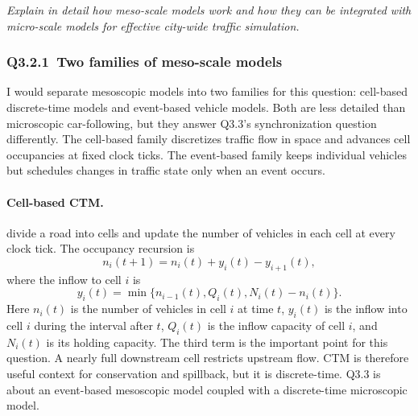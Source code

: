 \begin{bibunit}[plainnat]
\textit{Explain in detail how meso-scale models work and how they can be integrated with micro-scale models for effective city-wide traffic simulation.}

\subsubsection{Q3.2.1\ Two families of meso-scale models}

I would separate mesoscopic models into two families for this question:
cell-based discrete-time models and event-based vehicle models. Both are less
detailed than microscopic car-following, but they answer Q3.3's synchronization
question differently. The cell-based family discretizes traffic flow in space
and advances cell occupancies at fixed clock ticks. The event-based family
keeps individual vehicles but schedules changes in traffic state only when an
event occurs.

\paragraph*{Cell-based CTM.}
\citet{daganzo1994ctm} divide a road into cells and update the number of vehicles
in each cell at every clock tick. The occupancy recursion is
\[
  n_i(t+1)=n_i(t)+y_i(t)-y_{i+1}(t),
\]
where the inflow to cell $i$ is
\[
  y_i(t)=\min\{n_{i-1}(t),Q_i(t),N_i(t)-n_i(t)\}.
\]
Here $n_i(t)$ is the number of vehicles in cell $i$ at time $t$, $y_i(t)$ is
the inflow into cell $i$ during the interval after $t$, $Q_i(t)$ is the inflow
capacity of cell $i$, and $N_i(t)$ is its holding capacity. The third term is
the important point for this question. A nearly full downstream cell restricts
upstream flow. CTM is therefore useful context for conservation and spillback,
but it is discrete-time. Q3.3 is about an event-based mesoscopic model coupled
with a discrete-time microscopic model.


\end{bibunit}
